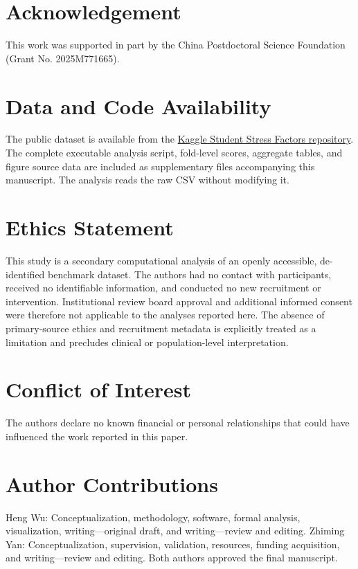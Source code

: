 \documentclass[review]{elsarticle}
\begin{document}
\section*{Acknowledgement}
This work was supported in part by the China Postdoctoral Science Foundation (Grant No. 2025M771665).

\section*{Data and Code Availability}
The public dataset is available from the \href{https://www.kaggle.com/datasets/rxnach/student-stress-factors-a-comprehensive-analysis}{Kaggle Student Stress Factors repository}. The complete executable analysis script, fold-level scores, aggregate tables, and figure source data are included as supplementary files accompanying this manuscript. The analysis reads the raw CSV without modifying it.

\section*{Ethics Statement}
This study is a secondary computational analysis of an openly accessible, de-identified benchmark dataset. The authors had no contact with participants, received no identifiable information, and conducted no new recruitment or intervention. Institutional review board approval and additional informed consent were therefore not applicable to the analyses reported here. The absence of primary-source ethics and recruitment metadata is explicitly treated as a limitation and precludes clinical or population-level interpretation.

\section*{Conflict of Interest}
The authors declare no known financial or personal relationships that could have influenced the work reported in this paper.

\section*{Author Contributions}
Heng Wu: Conceptualization, methodology, software, formal analysis, visualization, writing---original draft, and writing---review and editing. Zhiming Yan: Conceptualization, supervision, validation, resources, funding acquisition, and writing---review and editing. Both authors approved the final manuscript.
\end{document}
